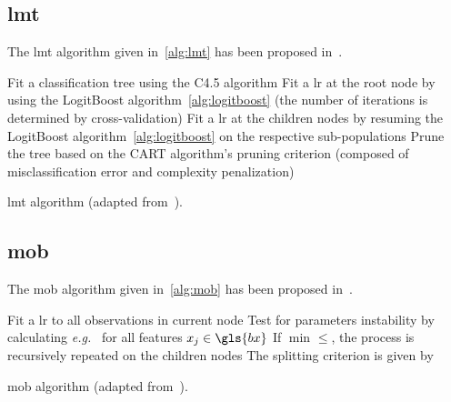 \subsection{\gls{lmt}} \label{app1:sec_lmt}

The \gls{lmt} algorithm given in~\eqref{alg:lmt} has been proposed in~\cite{landwehr2005logistic}.

\begin{algorithm}[H]
 Fit a classification tree using the C4.5 algorithm\;
 Fit a \gls{lr} at the root node by using the LogitBoost algorithm~\ref{alg:logitboost} (the number of iterations is determined by cross-validation)\;
 Fit a \gls{lr} at the children nodes by resuming the LogitBoost algorithm~\ref{alg:logitboost} on the respective sub-populations\;
 Prune the tree based on the CART algorithm's pruning criterion (composed of misclassification error and complexity penalization)\;
 \caption{\label{alg:lmt} \gls{lmt} algorithm (adapted from~\cite{landwehr2005logistic}).}
\end{algorithm}

\subsection{\gls{mob}} \label{app1:sec_mob}

The \gls{mob} algorithm given in~\eqref{alg:mob} has been proposed in~\cite{zeileis2008model}.

\begin{algorithm}[H]
 Fit a \gls{lr} to all observations in current node\;
 Test for parameters instability by calculating \textit{e.g.}\ $ $ for all features $x_j \in \gls{bx}$\;
 If $\min_{} \leq  $, the process is recursively repeated on the children nodes\;
 The splitting criterion is given by \;
 \caption{\label{alg:mob} \gls{mob} algorithm (adapted from~\cite{zeileis2008model}).}
\end{algorithm}

\printbibliography[heading=subbibliography, title=References of Appendix A]

